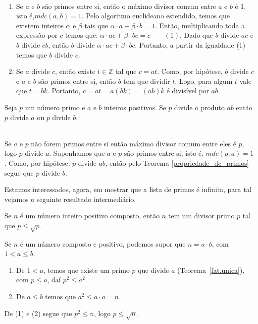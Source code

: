 \\
\begin{enumerate}
\item Se $a$ e $b$ s\~ao primos entre si, ent\~ao o m\'aximo divisor comum entre $a$ e $b$ \'e 1, isto \'e,$mdc(a,b)=1$. Pelo algoritmo euclideano estendido, temos que existem inteiros $\alpha$ e $\beta$ tais que $\alpha\cdot a+\beta\cdot b=1$. Ent\~ao, multiplicando toda a express\~ao por $c$ temos que: $\alpha\cdot ac+\beta\cdot bc=c\quad\quad (1)$. Dado que $b$ divide $ac$ e $b$ divide $cb$, ent\~ao $b$ divide $\alpha\cdot ac+\beta\cdot bc$. Portanto, a partir da igualdade (1) temos que $b$ divide $c$.

\item Se $a$ divide $c$, ent\~ao existe $t\in \mathbb{Z}$ tal que $c=at$. Como, por hip\'otese, $b$ divide $c$ e $a$ e $b$ s\~ao primos entre si, ent\~ao $b$ tem que dividir $t$. Logo, para algum $t$ vale que $t=bk$. Portanto, $c=at=a(bk)=(ab)k$ \'e divis\'ivel por $ab$.  	
\end{enumerate}	
\hfill\newline

\begin{Th}\label{fundprimos}
Seja $p$ um n\'umero primo e $a$ e $b$ inteiros positivos. 
Se $p$ divide o produto $ab$ ent\~ao $p$ divide $a$ ou $p$ divide $b$. 
\end{Th}

\\
Se $a$ e $p$ n\~ao forem primos entre si ent\~ao m\'aximo divisor comum entre eles \'e $p$, logo $p$ divide $a$. Suponhamos que $a$ e $p$ s\~ao primos entre si, isto \'e, $mdc(p,a)=1$. Como, por hip\'otese, $p$ divide $a\dot b$, ent\~ao pelo Teorema \ref{propriedade_de_primos} segue que $p$ divide $b$.
\hfill\newline

Estamos interessados, agora, em mostrar que a lista de primos \'e infinita, para tal vejamos o seguinte resultado intermedi\'ario.

\begin{Th}\label{divisor_primo}
Se $n$ \'e um n\'umero inteiro positivo composto, ent\~ao $n$ tem um divisor primo
$p$ tal que $p\leq\sqrt{p}$.
\end{Th}

\newline
Se $n$ \'e um n\'umero composto e positivo, podemos supor que $n=a\cdot b$, com $1<a\leq b$.
\begin{enumerate}
\item De $1<a$, temos que existe um primo $p$ que divide $a$ (Teorema~\ref{fat.unica}), com $p\leq a$, da\'i $p^2\leq a^2$.
\item De $a\leq b$ temos que $a^2\leq a\cdot a=n$
\end{enumerate}
De (1) e (2) segue que $p^2\leq n$, logo $p\leq\sqrt{n}$.
\hfill \newline

